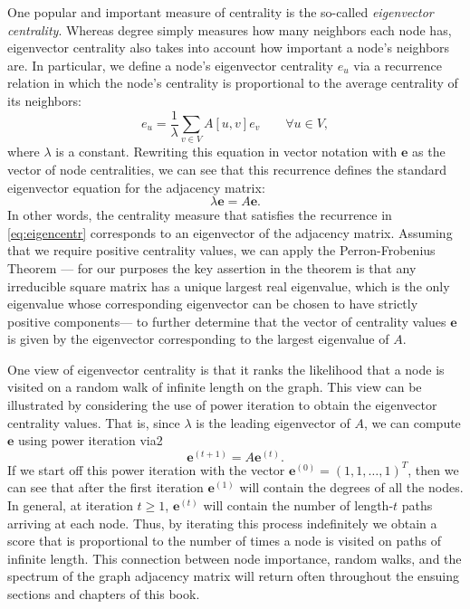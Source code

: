 \documentclass[10pt]{book}
\let\defaultmarginpar\marginpar
\renewcommand\marginpar[2][]{\defaultmarginpar{\itshape\color{gray}#2}}
\begin{document}
One popular and important measure of centrality is the so-called \emph{eigenvector centrality}\marginpar{eigenvector centrality}. Whereas degree simply measures how many neighbors each node has, eigenvector centrality also takes into account how important a node's neighbors are. In particular, we define a node's eigenvector centrality $e_u$ via a recurrence relation in which the node's centrality is proportional to the average centrality of its neighbors:
\begin{equation}
    e_u = \frac1\lambda \sum_{v \in V} A[u, v] e_v \qquad \forall u \in V,
    \label{eq:eigencentr}
\end{equation}
where $\lambda$ is a constant. Rewriting this equation in vector notation with $\mathbf e$ as the vector of node centralities, we can see that this recurrence defines the standard eigenvector equation for the adjacency matrix:
\begin{equation}
    \lambda \mathbf e = A \mathbf e.
\end{equation}
In other words, the centrality measure that satisfies the recurrence in \autoref{eq:eigencentr} corresponds to an eigenvector of the adjacency matrix. Assuming that we require positive centrality values, we can apply the Perron-Frobenius Theorem --- for our purposes the key assertion in the theorem is that any irreducible
square matrix has a unique largest real eigenvalue, which is the only eigenvalue whose corresponding eigenvector can be chosen to have strictly positive components---  to further determine that the vector of centrality values $\mathbf e$ is given by the eigenvector corresponding to the largest eigenvalue of $A$.

One view of eigenvector centrality is that it ranks the likelihood that a node is visited on a random walk of infinite length on the graph. This view can be illustrated by considering the use of power iteration to obtain the eigenvector centrality values. That is, since $\lambda$ is the leading eigenvector of $A$, we can compute $\mathbf e$ using power iteration via2
\begin{equation}
    \mathbf e^{(t+1)} = A \mathbf e^{(t)}.
\end{equation}
If we start off this power iteration with the vector $\mathbf e^{(0)} = (1, 1, \ldots, 1)^T$, then we can see that after the first iteration $\mathbf e^{(1)}$ will contain the degrees of all the nodes. In general, at iteration $t \ge 1$, $\mathbf e^{(t)}$ will contain the number of length-$t$ paths arriving at each node. Thus, by iterating this process indefinitely we obtain a score that is proportional to the number of times a node is visited on paths of
infinite length. This connection between node importance, random walks, and the spectrum of the graph adjacency matrix will return often throughout the ensuing sections and chapters of this book.
\smallskip
\end{document}
